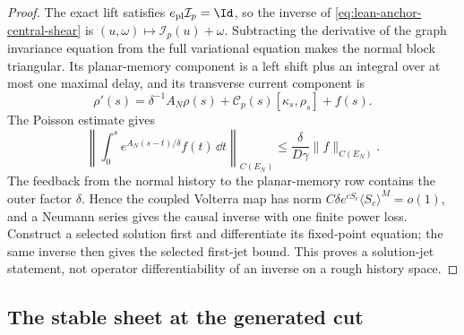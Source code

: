 
\begin{proof}
The exact lift satisfies \(e_{\rm pl}\mathcal I_p=\Id\), so the inverse of
\cref{eq:lean-anchor-central-shear} is
\((u,\omega)\mapsto\mathcal I_p(u)+\omega\).  Subtracting the derivative of
the graph invariance equation from the full variational equation makes the
normal block triangular.  Its planar-memory component is a left shift plus
an integral over at most one maximal delay, and its transverse current
component is
\[
 \rho'(s)=\delta^{-1}A_N\rho(s)
          +\mathscr C_p(s)[\kappa_s,\rho_s]+f(s).
\]
The Poisson estimate gives
\[
 \left\|\int_0^s e^{A_N(s-t)/\delta}f(t)\,\dd t\right\|_{C(E_N)}
 \le \frac{\delta}{D\gamma}\|f\|_{C(E_N)}.
\]
The feedback from the normal history to the planar-memory row contains the
outer factor \(\delta\).  Hence the coupled Volterra map has norm
\(C\delta e^{cS_c}\langle S_c\rangle^M=o(1)\), and a Neumann series gives
the causal inverse with one finite power loss.  Construct a selected
solution first and differentiate its fixed-point equation; the same inverse
then gives the selected first-jet bound.  This proves a solution-jet
statement, not operator differentiability of an inverse on a rough history
space.
\end{proof}

\subsection{The stable sheet at the generated cut}

